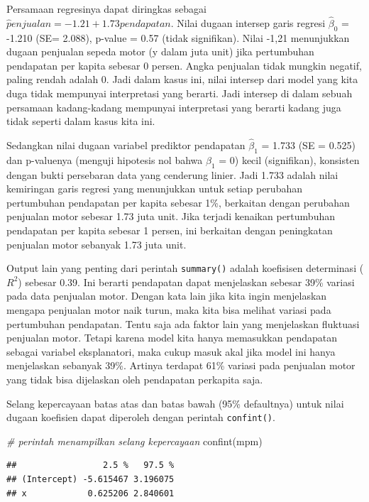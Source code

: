 \documentclass[
]{book}
\newenvironment{Shaded}{\begin{snugshade}}{\end{snugshade}}
\newcommand{\CommentTok}[1]{\textcolor[rgb]{0.56,0.35,0.01}{\textit{#1}}}
\newcommand{\FunctionTok}[1]{\textcolor[rgb]{0.00,0.00,0.00}{#1}}
\newcommand{\NormalTok}[1]{#1}
\begin{document}
Persamaan regresinya dapat diringkas sebagai \(\hat penjualan=-1.21+1.73pendapatan\). Nilai dugaan intersep garis regresi \(\hat \beta_0\) = -1.210 (SE= 2.088), p-value = 0.57 (tidak signifikan). Nilai -1,21 menunjukkan dugaan penjualan sepeda motor (y dalam juta unit) jika pertumbuhan pendapatan per kapita sebesar 0 persen. Angka penjualan tidak mungkin negatif, paling rendah adalah 0. Jadi dalam kasus ini, nilai intersep dari model yang kita duga tidak mempunyai interpretasi yang berarti. Jadi intersep di dalam sebuah persamaan kadang-kadang mempunyai interpretasi yang berarti kadang juga tidak seperti dalam kasus kita ini.

Sedangkan nilai dugaan variabel prediktor pendapatan \(\hat \beta_1\) = 1.733 (SE = 0.525) dan p-valuenya (menguji hipotesis nol bahwa \(\beta_1\) = 0) kecil (signifikan), konsisten dengan bukti persebaran data yang cenderung linier. Jadi 1.733 adalah nilai kemiringan garis regresi yang menunjukkan untuk setiap perubahan pertumbuhan pendapatan per kapita sebesar 1\%, berkaitan dengan perubahan penjualan motor sebesar 1.73 juta unit. Jika terjadi kenaikan pertumbuhan pendapatan per kapita sebesar 1 persen, ini berkaitan dengan peningkatan penjualan motor sebanyak 1.73 juta unit.

Output lain yang penting dari perintah \texttt{summary()} adalah koefisisen determinasi (\(R^2\)) sebesar 0.39. Ini berarti pendapatan dapat menjelaskan sebesar 39\% variasi pada data penjualan motor. Dengan kata lain jika kita ingin menjelaskan mengapa penjualan motor naik turun, maka kita bisa melihat variasi pada pertumbuhan pendapatan. Tentu saja ada faktor lain yang menjelaskan fluktuasi penjualan motor. Tetapi karena model kita hanya memasukkan pendapatan sebagai variabel eksplanatori, maka cukup masuk akal jika model ini hanya menjelaskan sebanyak 39\%. Artinya terdapat 61\% variasi pada penjualan motor yang tidak bisa dijelaskan oleh pendapatan perkapita saja.

Selang kepercayaan batas atas dan batas bawah (95\% defaultnya) untuk nilai dugaan koefisien dapat diperoleh dengan perintah \texttt{confint()}.

\begin{Shaded}
\begin{Highlighting}[]
\CommentTok{\# perintah menampilkan selang kepercayaan}
\FunctionTok{confint}\NormalTok{(mpm)}
\end{Highlighting}
\end{Shaded}

\begin{verbatim}
##                 2.5 %   97.5 %
## (Intercept) -5.615467 3.196075
## x            0.625206 2.840601
\end{verbatim}
\end{document}
